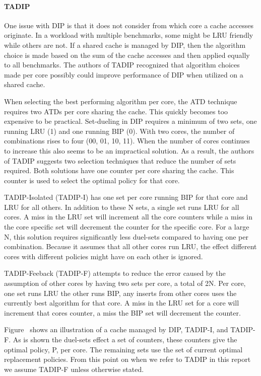 \paragraph{TADIP}

One issue with DIP is that it does not consider from which core a cache accesses originate.
In a workload with multiple benchmarks, some might be LRU friendly while others are not. 
If a shared cache is managed by DIP, then the algorithm choice is made based on the sum of the cache accesses and then applied equally to all benchmarks.
The authors of TADIP recognized that algorithm choices made per core possibly could improve performance of DIP when utilized on a shared cache.

When selecting the best performing algorithm per core, the ATD technique requires two ATDs per core sharing the cache. 
This quickly becomes too expensive to be practical.
Set-dueling in DIP requires a minimum of two sets, one running LRU (1) and one running BIP (0). 
With two cores, the number of combinations rises to four (00, 01, 10, 11).
When the number of cores continues to increase this also seems to be an impractical solution.
As a result, the authors of TADIP suggests two selection techniques that reduce the number of sets required. 
Both solutions have one counter per core sharing the cache.
This counter is used to select the optimal policy for that core.

TADIP-Isolated (TADIP-I) has one set per core running BIP for that core and LRU for all others.
In addition to these N sets, a single set runs LRU for all cores. 
A miss in the LRU set will increment all the core counters while a miss in the core specific set will decrement the counter for the specific core.
For a large N, this solution requires significantly less duel-sets compared to having one per combination. 
Because it assumes that all other cores run LRU, the effect different cores with different policies might have on each other is ignored.

TADIP-Feeback (TADIP-F) attempts to reduce the error caused by the assumption of other cores by having two sets per core, a total of 2N.
Per core, one set runs LRU the other runs BIP, any inserts from other cores uses the currently best algorithm for that core.
A miss in the LRU set for a core will increment that cores counter, a miss the BIP set will decrement the counter.


Figure~ shows an illustration of a cache managed by DIP, TADIP-I, and TADIP-F. 
As is shown the duel-sets effect a set of counters, these counters give the optimal policy, P, per core. 
The remaining sets use the set of current optimal replacement policies.
From this point on when we refer to TADIP in this report we assume TADIP-F unless otherwise stated.


